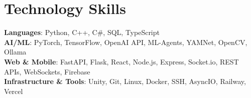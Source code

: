 \documentclass[letterpaper,11pt]{article}
\begin{document}
\section{Technology Skills}
 \begin{itemize}[leftmargin=0.15in, label={}]
    \small{\item{
     \textbf{Languages}{: Python, C++, C\#, SQL, TypeScript} \\
     \textbf{AI/ML}{: PyTorch, TensorFlow, OpenAI API, ML-Agents, YAMNet, OpenCV, Ollama} \\
     \textbf{Web \& Mobile}{: FastAPI, Flask, React, Node.js, Express, Socket.io, REST APIs, WebSockets, Firebase} \\
     \textbf{Infrastructure \& Tools}{: Unity, Git, Linux, Docker, SSH, AsyncIO, Railway, Vercel}
    }}
 \end{itemize}

\end{document}
